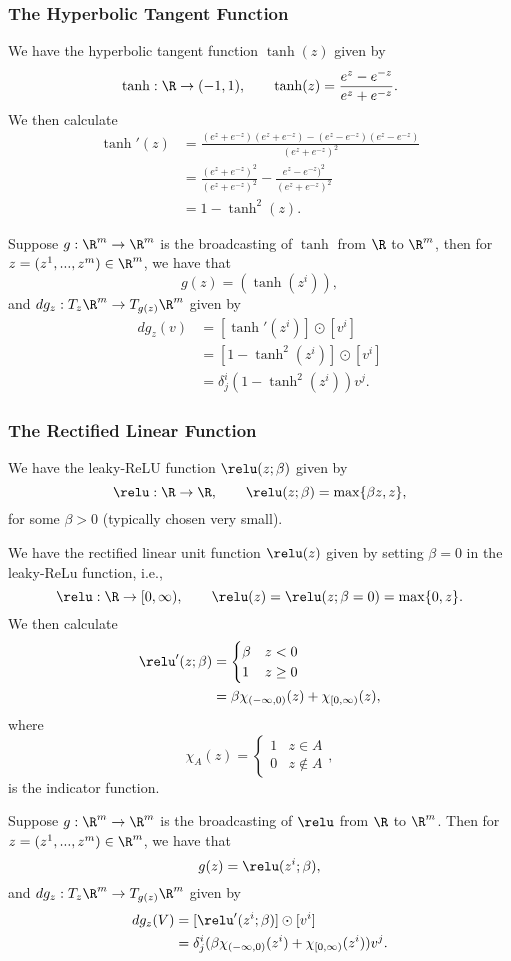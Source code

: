 \subsubsection{The Hyperbolic Tangent Function}
We have the hyperbolic tangent function $\tanh(z)$ given by
$$\tanh:\R\to(-1,1),\qquad\tanh(z)=\frac{e^z-e^{-z}}{e^z+e^{-z}}.$$
We then calculate
\begin{align*}
	\tanh'(z)&=\frac{(e^z+e^{-z})(e^z+e^{-z})-(e^z-e^{-z})(e^z-e^{-z})}{(e^z+e^{-z})^2}\\
	&=\frac{(e^z+e^{-z})^2}{(e^z+e^{-z})^2}-\frac{e^z-e^{-z})^2}{(e^z+e^{-z})^2}\\
	&=1-\tanh^2(z).
\end{align*}

Suppose $g:\R^m\to\R^m$ is the broadcasting of $\tanh$ from $\R$ to $\R^m$, then for $z=(z^1,...,z^m)\in\R^m$, we have that
$$g(z)=(\tanh(z^i)),$$
and $dg_z:T_z\R^m\to T_{g(z)}\R^m$ given by
\begin{align*}
	dg_z(v)&=[\tanh'(z^i)]\odot[v^i]\\
	&=[1-\tanh^2(z^i)]\odot[v^i]\\
	&=\delta^i_j(1-\tanh^2(z^i))v^j.
\end{align*}


\subsubsection{The Rectified Linear Function}
We have the leaky-ReLU function $\relu(z;\beta)$ given by
$$\relu:\R\to\R,\qquad \relu(z;\beta)=\max\{\beta z, z\},$$
for some $\beta>0$ (typically chosen very small).

We have the rectified linear unit function $\relu(z)$ given by setting $\beta=0$ in the leaky-ReLu function, i.e.,
$$\relu:\R\to[0,\infty),\qquad\relu(z)=\relu(z;\beta=0)=\max\{0,z\}.$$
We then calculate
\begin{align*}
	\relu'(z;\beta)&=\begin{cases}
		\beta&z<0\\
		1&z\geq0
	\end{cases}\\
	&=\beta\chi_{(-\infty,0)}(z)+\chi_{[0,\infty)}(z),
\end{align*}
where
$$\chi_A(z)=\begin{cases}
	1&z\in A\\
	0&z\notin A
\end{cases},$$
is the indicator function.

Suppose $g:\R^m\to\R^m$ is the broadcasting of $\relu$ from $\R$ to $\R^m$.   Then for $z=(z^1,...,z^m)\in\R^m$, we have that
$$g(z)=\relu(z^i;\beta),$$
and $dg_z:T_z\R^m\to T_{g(z)}\R^m$ given by
\begin{align*}
	dg_z(V)&=[\relu'(z^i;\beta)]\odot[v^i]\\
	&=\delta^i_j(\beta\chi_{(-\infty,0)}(z^i)+\chi_{[0,\infty)}(z^i))v^j.
\end{align*}


